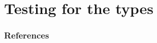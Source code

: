 \documentclass[hyperref={pdfpagelabels=false}]{beamer}
\begin{document}
\section{Testing for the types}

\begin{frame}[allowframebreaks]
\frametitle{References}
\newcommand*{\newblock}{natbib}


\end{frame}
\end{document}
